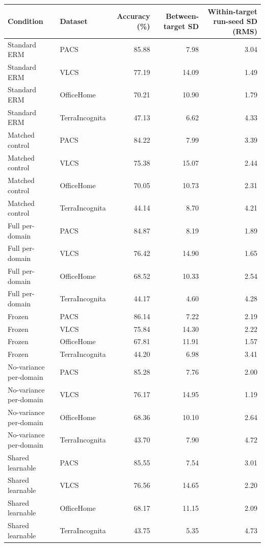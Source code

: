 \begin{tabular}{llrrr}
\toprule
Condition & Dataset & Accuracy (\%) & Between-target SD & Within-target run-seed SD (RMS) \\
\midrule
Standard ERM & PACS & 85.88 & 7.98 & 3.04 \\
Standard ERM & VLCS & 77.19 & 14.09 & 1.49 \\
Standard ERM & OfficeHome & 70.21 & 10.90 & 1.79 \\
Standard ERM & TerraIncognita & 47.13 & 6.62 & 4.33 \\
Matched control & PACS & 84.22 & 7.99 & 3.39 \\
Matched control & VLCS & 75.38 & 15.07 & 2.44 \\
Matched control & OfficeHome & 70.05 & 10.73 & 2.31 \\
Matched control & TerraIncognita & 44.14 & 8.70 & 4.21 \\
Full per-domain & PACS & 84.87 & 8.19 & 1.89 \\
Full per-domain & VLCS & 76.42 & 14.90 & 1.65 \\
Full per-domain & OfficeHome & 68.52 & 10.33 & 2.54 \\
Full per-domain & TerraIncognita & 44.17 & 4.60 & 4.28 \\
Frozen & PACS & 86.14 & 7.22 & 2.19 \\
Frozen & VLCS & 75.84 & 14.30 & 2.22 \\
Frozen & OfficeHome & 67.81 & 11.91 & 1.57 \\
Frozen & TerraIncognita & 44.20 & 6.98 & 3.41 \\
No-variance per-domain & PACS & 85.28 & 7.76 & 2.00 \\
No-variance per-domain & VLCS & 76.17 & 14.95 & 1.19 \\
No-variance per-domain & OfficeHome & 68.36 & 10.10 & 2.64 \\
No-variance per-domain & TerraIncognita & 43.70 & 7.90 & 4.72 \\
Shared learnable & PACS & 85.55 & 7.54 & 3.01 \\
Shared learnable & VLCS & 76.56 & 14.65 & 2.20 \\
Shared learnable & OfficeHome & 68.17 & 11.15 & 2.09 \\
Shared learnable & TerraIncognita & 43.75 & 5.35 & 4.73 \\
\bottomrule
\end{tabular}
